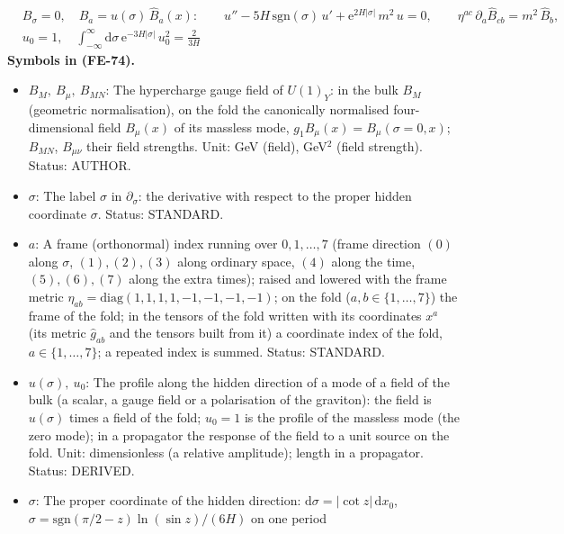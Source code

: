 \documentclass[
  10pt,
]{article}
\providecommand{\tightlist}{%
  \setlength{\itemsep}{0pt}\setlength{\parskip}{0pt}}
\begin{document}
\[
\begin{aligned}
&B_\sigma = 0,\quad B_a = u(\sigma)\,\hat B_a(x):\qquad
u'' - 5H\,\mathrm{sgn}(\sigma)\,u' + \mathrm{e}^{2H\lvert\sigma\rvert}\,m^2\,u = 0,\qquad
\eta^{ac}\,\partial_a\hat B_{cb} = m^2\,\hat B_b,\\
&u_0 = 1,\quad \int_{-\infty}^{\infty}\mathrm{d}\sigma\,\mathrm{e}^{-3H\lvert\sigma\rvert}\,u_0^2 = \frac{2}{3H}
\end{aligned} \tag{FE-74}
\] \textbf{Symbols in (FE-74).}

\begin{itemize}
\tightlist
\item
  \(B_M,\ B_\mu,\ B_{MN}\): The hypercharge gauge field of \(U(1)_Y\):
  in the bulk \(B_M\) (geometric normalisation), on the fold the
  canonically normalised four-dimensional field \(B_\mu(x)\) of its
  massless mode, \(g_1B_\mu(x) = B_\mu(\sigma = 0, x)\); \(B_{MN}\),
  \(B_{\mu\nu}\) their field strengths. Unit: GeV (field), GeV\(^2\)
  (field strength). Status: AUTHOR.
\item
  \(\sigma\): The label \(\sigma\) in \(\partial_\sigma\): the
  derivative with respect to the proper hidden coordinate \(\sigma\).
  Status: STANDARD.
\item
  \(a\): A frame (orthonormal) index running over \(0, 1, \dots, 7\)
  (frame direction \((0)\) along \(\sigma\), \((1), (2), (3)\) along
  ordinary space, \((4)\) along the time, \((5), (6), (7)\) along the
  extra times); raised and lowered with the frame metric
  \(\eta_{ab} = \mathrm{diag}(1, 1, 1, 1, -1, -1, -1, -1)\); on the fold
  (\(a, b \in \{1, \dots, 7\}\)) the frame of the fold; in the tensors
  of the fold written with its coordinates \(x^a\) (its metric
  \(\hat g_{ab}\) and the tensors built from it) a coordinate index of
  the fold, \(a \in \{1, \dots, 7\}\); a repeated index is summed.
  Status: STANDARD.
\item
  \(u(\sigma),\ u_0\): The profile along the hidden direction of a mode
  of a field of the bulk (a scalar, a gauge field or a polarisation of
  the graviton): the field is \(u(\sigma)\) times a field of the fold;
  \(u_0 = 1\) is the profile of the massless mode (the zero mode); in a
  propagator the response of the field to a unit source on the fold.
  Unit: dimensionless (a relative amplitude); length in a propagator.
  Status: DERIVED.
\item
  \(\sigma\): The proper coordinate of the hidden direction:
  \(\mathrm{d}\sigma = \lvert\cot z\rvert\,\mathrm{d}x_0\),
  \(\sigma = \mathrm{sgn}(\pi/2 - z)\ln(\sin z)/(6H)\) on one period

\end{itemize}
\end{document}
